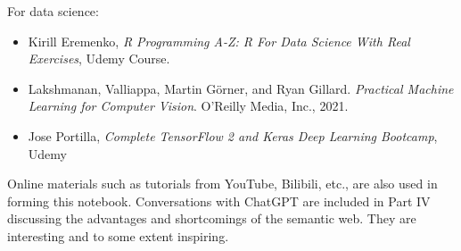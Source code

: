 For data science:
\begin{itemize}
  \item Kirill Eremenko, \textit{R Programming A-Z: R For Data Science With Real Exercises}, Udemy Course.
  \item Lakshmanan, Valliappa, Martin Görner, and Ryan Gillard. \textit{Practical Machine Learning for Computer Vision}. O'Reilly Media, Inc., 2021.
  \item Jose Portilla, \textit{Complete TensorFlow 2 and Keras Deep Learning Bootcamp}, Udemy
\end{itemize}

Online materials such as tutorials from YouTube, Bilibili, etc., are also used in forming this notebook. Conversations with ChatGPT are included in Part IV discussing the advantages and shortcomings of the semantic web. They are interesting and to some extent inspiring. 